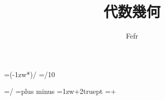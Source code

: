\documentclass[dvipdfmx,a4paper,11pt]{jsarticle}
\begin{document}
\theoremstyle{plain}
\newtheorem{thm}{Theorem}[section]
\newtheorem{lem}[thm]{Lemma}
\newtheorem{prop}[thm]{Proposition}
\newtheorem{cor}[thm]{Corollary}
\newtheorem{conj}[thm]{Conjecture}

\theoremstyle{definition}
\newtheorem{ass}[thm]{Assumption}
\newtheorem{dfn}[thm]{Definition}

\theoremstyle{remark}
\newtheorem{rem}[thm]{Remark}

\theoremstyle{plain}
\newtheorem*{thm*}{Theorem}
\newtheorem*{lem*}{Lemma}
\newtheorem*{prop*}{Proposition}
\newtheorem*{cor*}{Corollary}
\newtheorem*{conj*}{Conjecture}

\theoremstyle{definition}
\newtheorem*{ass*}{Assumption}
\newtheorem*{dfn*}{Definition}

\theoremstyle{remark}
\newtheorem*{Proof}{Proof}


\theoremstyle{remark}
\newtheorem*{rem*}{Remark}

\setlength{\footskip}{20truemm}



\makeatletter
\newcount\@chars\newcount\@lines
{}                      %

\newdimen\@kanjiskip
\@kanjiskip=\dimexpr(\textwidth-1zw*\@chars)/\numexpr{}
\newdimen\@@kanjiskip
\@@kanjiskip=\dimexpr\@kanjiskip/10

\baselineskip=\dimexpr\textheight/\@lines
\kanjiskip=\@kanjiskip plus \@@kanjiskip minus \@@kanjiskip
\parindent=\dimexpr 1zw+2truept
\parindent=\dimexpr\parindent+\@kanjiskip
\makeatother


\title{代数幾何}
\date{}
\author{Fefr}
\maketitle
\tableofcontents
\clearpage

\end{document}
